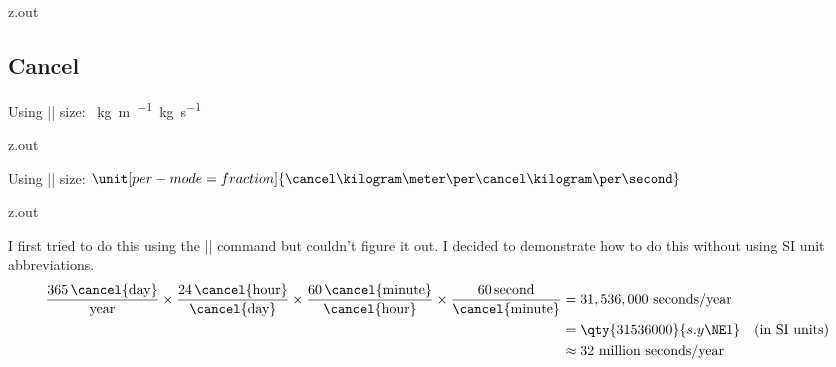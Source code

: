 \begin{VerbatimOut}{z.out}

\subsection{Cancel}

Using |\textstyle| size:
\unit[per-mode = fraction]
{\cancel\kilogram\meter\per\cancel\kilogram\per\second}
\end{VerbatimOut}

\MyIO


\begin{VerbatimOut}{z.out}

Using |\displaystyle| size:
{
  \(
    \displaystyle
    \unit[per-mode = fraction]%
    {\cancel\kilogram\meter\per\cancel\kilogram\per\second}
  \)
}
\end{VerbatimOut}

\MyIO


\begin{VerbatimOut}{z.out}
  
I first tried to do this using the  |\per| command
but couldn't figure it out.
I decided to demonstrate how to do this without using SI unit abbreviations.
\begin{align}
          \frac {365\,\cancel{\textrm{day}}}    {\textrm{year}}
  \times  \frac {24\,\cancel{\textrm{hour}}}    {\cancel{\textrm{day}}}
  \times  \frac {60\,\cancel{\textrm{minute}}}  {\cancel{\textrm{hour}}}
  \times  \frac {60\,\textrm{\textrm{second}}}  {\cancel{\textrm{minute}}}
  & = 31,536,000 \textrm{ seconds/year}\nonumber\\
  & = \qty{31536000}{s.y\NE1}\quad\text{(in SI units)}\nonumber\\
  & \approx \textrm{32 million seconds/year}\nonumber
\end{align}
\end{VerbatimOut}

\MyIO






